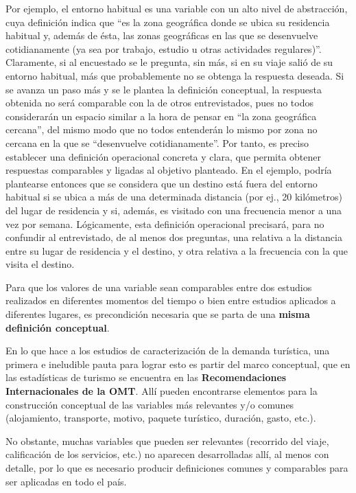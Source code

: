 \documentclass[
]{book}
\begin{document}
Por ejemplo, el entorno habitual es una variable con un alto nivel de abstracción, cuya definición indica que ``es la zona geográfica donde se ubica su residencia habitual y, además de ésta, las zonas geográficas en las que se desenvuelve cotidianamente (ya sea por trabajo, estudio u otras actividades regulares)''. Claramente, si al encuestado se le pregunta, sin más, si en su viaje salió de su entorno habitual, más que probablemente no se obtenga la respuesta deseada. Si se avanza un paso más y se le plantea la definición conceptual, la respuesta obtenida no será comparable con la de otros entrevistados, pues no todos considerarán un espacio similar a la hora de pensar en ``la zona geográfica cercana'', del mismo modo que no todos entenderán lo mismo por zona no cercana en la que se ``desenvuelve cotidianamente''. Por tanto, es preciso establecer una definición operacional concreta y clara, que permita obtener respuestas comparables y ligadas al objetivo planteado. En el ejemplo, podría plantearse entonces que se considera que un destino está fuera del entorno habitual si se ubica a más de una determinada distancia (por ej., 20 kilómetros) del lugar de residencia y si, además, es visitado con una frecuencia menor a una vez por semana. Lógicamente, esta definición operacional precisará, para no confundir al entrevistado, de al menos dos preguntas, una relativa a la distancia entre su lugar de residencia y el destino, y otra relativa a la frecuencia con la que visita el destino.

Para que los valores de una variable sean comparables entre dos estudios realizados en diferentes momentos del tiempo o bien entre estudios aplicados a diferentes lugares, es precondición necesaria que se parta de una \textbf{misma definición conceptual}.

En lo que hace a los estudios de caracterización de la demanda turística, una primera e ineludible pauta para lograr esto es partir del marco conceptual, que en las estadísticas de turismo se encuentra en las \textbf{Recomendaciones Internacionales de la OMT}. Allí pueden encontrarse elementos para la construcción conceptual de las variables más relevantes y/o comunes (alojamiento, transporte, motivo, paquete turístico, duración, gasto, etc.).

No obstante, muchas variables que pueden ser relevantes (recorrido del viaje, calificación de los servicios, etc.) no aparecen desarrolladas allí, al menos con detalle, por lo que es necesario producir definiciones comunes y comparables para ser aplicadas en todo el país.
\end{document}

